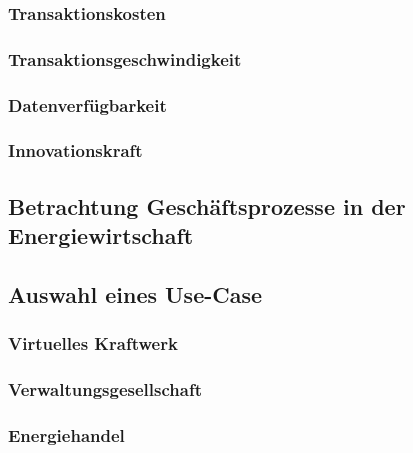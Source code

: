 \subsubsection{Transaktionskosten}

\subsubsection{Transaktionsgeschwindigkeit}

\subsubsection{Datenverfügbarkeit}

\subsubsection{Innovationskraft}

\subsection{Betrachtung Geschäftsprozesse in der Energiewirtschaft}

\subsection{Auswahl eines Use-Case}

\subsubsection{Virtuelles Kraftwerk}

\subsubsection{Verwaltungsgesellschaft}

\subsubsection{Energiehandel}

\newpage